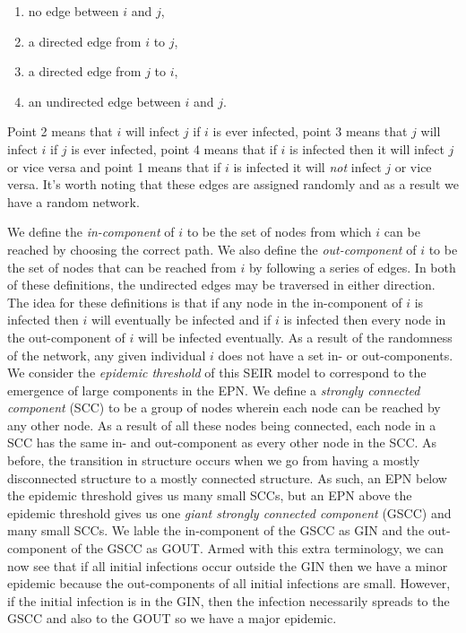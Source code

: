 \begin{enumerate}
  \item no edge between $i$ and $j$,
  \item a directed edge from $i$ to $j$,
  \item a directed edge from $j$ to $i$,
  \item an undirected edge between $i$ and $j$.
\end{enumerate}

Point 2 means that $i$ will infect $j$ if $i$ is ever infected, point 3 means that $j$ will infect $i$ if $j$ is ever infected, point 4 means that if $i$ is infected then it will infect $j$ or vice
versa and point 1 means that if $i$ is infected it will \textit{not} infect $j$ or vice versa. It's worth noting that these edges are assigned randomly and as a result we have a
random network.

We define the \textit{in-component} of $i$ to be the set of nodes from which $i$ can be reached by choosing the correct path. We also define the \textit{out-component} of $i$ to be the set of nodes that can be reached from $i$
by following a series of edges. In both of these definitions, the undirected edges may be traversed in either direction. The idea for these definitions is that if any node in the
in-component of $i$ is infected then $i$ will eventually be infected and if $i$ is infected then every node in the out-component of $i$ will be infected eventually. As a result of
the randomness of the network, any given individual $i$ does not have a set in- or out-components. We consider the \textit{epidemic threshold} of this SEIR model to correspond to
the emergence of large components in the EPN. We define a \textit{strongly connected component} (SCC) to be a group of nodes wherein each node can be reached by any other node. As a
result of all these nodes being connected, each node in a SCC has the same in- and out-component as every other node in the SCC. As before, the transition in structure occurs when
we go from having a mostly disconnected structure to a mostly connected structure. As such, an EPN below the epidemic threshold gives us many small SCCs, but an EPN
above the epidemic threshold gives us one \textit{giant strongly connected component} (GSCC) and many small SCCs. We lable the in-component of the GSCC as GIN and the
out-component of the GSCC as GOUT. Armed with this extra terminology, we can now see that if all initial infections occur outside the GIN then we have a minor epidemic because the
out-components of all initial infections are small. However, if the initial infection is in the GIN, then the infection necessarily spreads to the GSCC and also to the GOUT so we
have a major epidemic.

